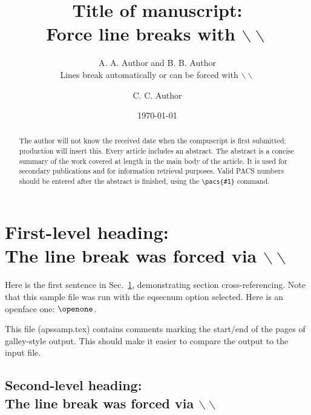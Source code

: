 \draft
{}
\title{Title of manuscript:\\
Force line breaks with $\backslash\backslash$
}
\author{A. A.  Author and B. B. Author\cite{byline}\\
Lines break automatically or can be forced
with $\backslash\backslash$}
\address{
Authors' institution and/or address\\
This line break forced with $\backslash\backslash$
}
\author{C. C. Author}
\address{
Second author institution and/or address\\
This line break forced with $\backslash\backslash$
}
\date{\today}
\maketitle
\begin{abstract}
The author will not know the received date when the compuscript
is first submitted; production will insert this. Every
article includes an abstract.  The abstract is a concise
summary of the work covered at length
in the main body of the article.
It is used for secondary publications and for information retrieval
purposes. Valid PACS numbers should be entered after the abstract
is finished, using the \verb+\pacs{#1}+ command.
\end{abstract}

\narrowtext

\section{First-level heading:\protect\\ The line break was forced via
$\backslash\backslash$}
\label{sec:level1}

Here is the first sentence in Sec.\ \ref{sec:level1}, demonstrating
section cross-referencing. Note that this sample file was run
with the eqsecnum option selected.
Here is an openface one: $\openone$.

This file (apssamp.tex) contains comments marking the start/end of the
pages of galley-style output. This should make it easier to compare the
output to the input file.

\subsection{Second-level heading:\protect\\ The line break was forced via
$\backslash\backslash$}
\label{sec:level2}

